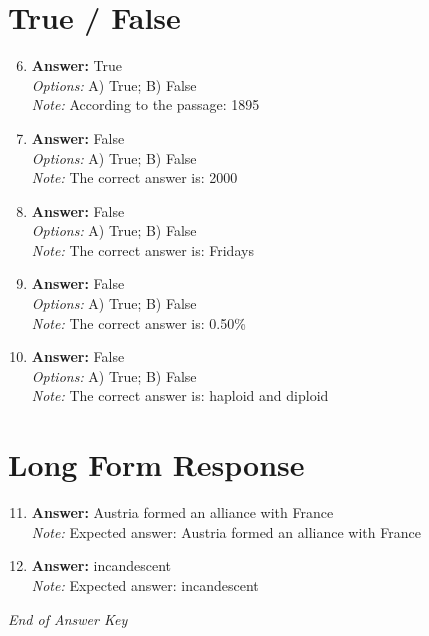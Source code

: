 \documentclass[12pt]{article}
\begin{document}
\section*{True / False}
\begin{enumerate}[label=\arabic*.]
\setcounter{enumi}{5}
\item \textbf{Answer:} True
\\ \textit{Options:} A) True; B) False
\\ \textit{Note:} According to the passage: 1895
\item \textbf{Answer:} False
\\ \textit{Options:} A) True; B) False
\\ \textit{Note:} The correct answer is: 2000
\item \textbf{Answer:} False
\\ \textit{Options:} A) True; B) False
\\ \textit{Note:} The correct answer is: Fridays
\item \textbf{Answer:} False
\\ \textit{Options:} A) True; B) False
\\ \textit{Note:} The correct answer is: 0.50\%
\item \textbf{Answer:} False
\\ \textit{Options:} A) True; B) False
\\ \textit{Note:} The correct answer is: haploid and diploid
\end{enumerate}

\section*{Long Form Response}
\begin{enumerate}[label=\arabic*.]
\setcounter{enumi}{10}
\item \textbf{Answer:} Austria formed an alliance with France
\\ \textit{Note:} Expected answer: Austria formed an alliance with France
\item \textbf{Answer:} incandescent
\\ \textit{Note:} Expected answer: incandescent
\end{enumerate}

\vfill
\noindent\textit{End of Answer Key}
\end{document}
